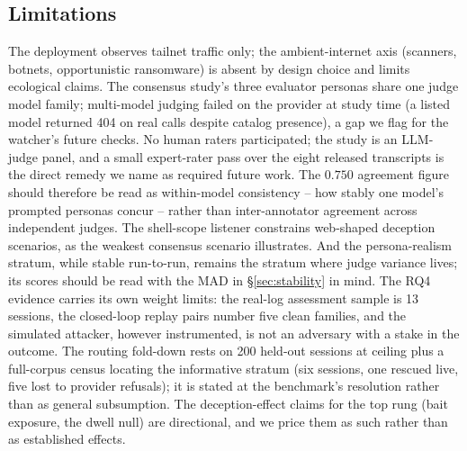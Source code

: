 \subsection{Limitations}
The deployment observes tailnet traffic only; the ambient-internet axis
(scanners, botnets, opportunistic ransomware) is absent by design choice
and limits ecological claims. The consensus study's three evaluator
personas share one judge model family; multi-model judging failed on the
provider at study time (a listed model returned 404 on real calls despite
catalog presence), a gap we flag for the watcher's future checks. No
human raters participated; the study is an LLM-judge panel, and a small
expert-rater pass over the eight released transcripts is the direct
remedy we name as required future work. The
$0.750$ agreement figure should therefore be read as within-model
consistency -- how stably one model's prompted personas concur -- rather
than inter-annotator agreement across independent judges. The shell-scope listener constrains web-shaped deception scenarios, as the
weakest consensus scenario illustrates. And the persona-realism stratum,
while stable run-to-run, remains the stratum where judge variance lives;
its scores should be read with the MAD in \S\ref{sec:stability} in mind.
The RQ4 evidence carries its own weight limits: the real-log assessment
sample is 13 sessions, the closed-loop replay pairs number five
clean families, and the simulated attacker, however instrumented, is not
an adversary with a stake in the outcome. The routing fold-down rests on
200 held-out sessions at ceiling plus a full-corpus census locating the
informative stratum (six sessions, one rescued live, five lost to
provider refusals); it is stated at the benchmark's resolution rather
than as general subsumption. The deception-effect claims for the
top rung (bait exposure, the dwell null) are directional, and we price
them as such rather than as established effects.
